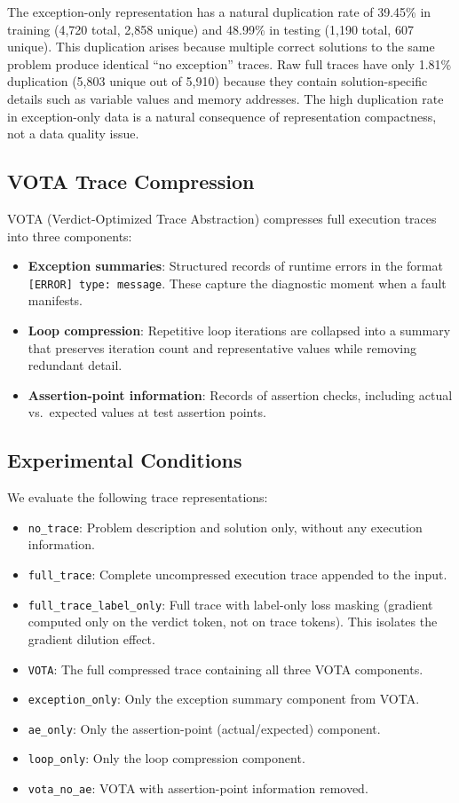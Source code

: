 \documentclass[11pt]{article}
\begin{document}
The exception-only representation has a natural duplication rate of 39.45\% in training (4,720 total, 2,858 unique) and 48.99\% in testing (1,190 total, 607 unique). This duplication arises because multiple correct solutions to the same problem produce identical ``no exception'' traces. Raw full traces have only 1.81\% duplication (5,803 unique out of 5,910) because they contain solution-specific details such as variable values and memory addresses. The high duplication rate in exception-only data is a natural consequence of representation compactness, not a data quality issue.

\subsection{VOTA Trace Compression}

VOTA (Verdict-Optimized Trace Abstraction) compresses full execution traces into three components:

\begin{itemize}
    \item \textbf{Exception summaries}: Structured records of runtime errors in the format \texttt{[ERROR] type: message}. These capture the diagnostic moment when a fault manifests.
    \item \textbf{Loop compression}: Repetitive loop iterations are collapsed into a summary that preserves iteration count and representative values while removing redundant detail.
    \item \textbf{Assertion-point information}: Records of assertion checks, including actual vs.\ expected values at test assertion points.
\end{itemize}

\subsection{Experimental Conditions}

We evaluate the following trace representations:

\begin{itemize}
    \item \texttt{no\_trace}: Problem description and solution only, without any execution information.
    \item \texttt{full\_trace}: Complete uncompressed execution trace appended to the input.
    \item \texttt{full\_trace\_label\_only}: Full trace with label-only loss masking (gradient computed only on the verdict token, not on trace tokens). This isolates the gradient dilution effect.
    \item \texttt{VOTA}: The full compressed trace containing all three VOTA components.
    \item \texttt{exception\_only}: Only the exception summary component from VOTA.
    \item \texttt{ae\_only}: Only the assertion-point (actual/expected) component.
    \item \texttt{loop\_only}: Only the loop compression component.
    \item \texttt{vota\_no\_ae}: VOTA with assertion-point information removed.
\end{itemize}
\end{document}
